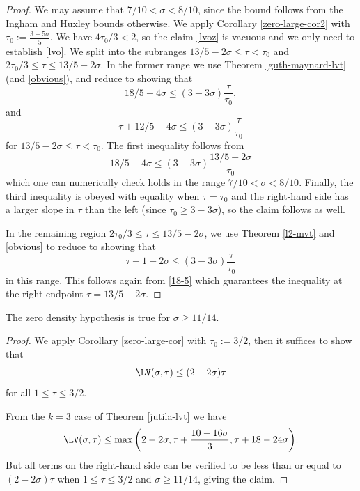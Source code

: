 \begin{proof} We may assume that $7/10 < \sigma < 8/10$, since the bound follows from the Ingham and Huxley bounds otherwise.  We apply Corollary \ref{zero-large-cor2} with $\tau_0 := \frac{3+5\sigma}{5}$.  We have $4\tau_0/3 < 2$, so the claim \eqref{lvoz} is vacuous and we only need to establish \eqref{lvo}.  We split into the subranges $13/5-2\sigma \leq \tau < \tau_0$ and $2\tau_0/3 \leq \tau \leq 13/5-2\sigma$. In the former range we use Theorem \ref{guth-maynard-lvt} (and \eqref{obvious}), and reduce to showing that
$$ 18/5 - 4 \sigma \leq (3-3\sigma) \frac{\tau}{\tau_0},$$
and
$$ \tau + 12/5 - 4\sigma \leq (3-3\sigma) \frac{\tau}{\tau_0}$$
for $13/5-2\sigma \leq \tau < \tau_0$.  The first inequality follows from
\begin{equation}\label{18-5}
 18/5 - 4 \sigma \leq (3-3\sigma) \frac{13/5-2\sigma}{\tau_0}
\end{equation}
which one can numerically check holds in the range $7/10 < \sigma < 8/10$.  Finally, the third inequality is obeyed with equality when $\tau=\tau_0$ and the right-hand side has a larger slope in $\tau$ than the left (since $\tau_0 \geq 3-3\sigma$), so the claim follows as well.

In the remaining region $2\tau_0/3 \leq \tau \leq 13/5-2\sigma$, we use Theorem \ref{l2-mvt} and \eqref{obvious} to reduce to showing that
$$ \tau + 1 - 2\sigma \leq (3-3\sigma) \frac{\tau}{\tau_0}$$
in this range.  This follows again from \eqref{18-5} which guarantees the inequality at the right endpoint $\tau = 13/5-2\sigma$.
\end{proof}

\begin{theorem}\label{jutila-density} \cite{jutila_zero_density_1977} The zero density hypothesis is true for $\sigma \geq 11/14$.
\end{theorem}
\derived
{}

\begin{proof}
We apply Corollary \ref{zero-large-cor} with $\tau_0 := 3/2$, then it suffices to show that
    $$\LV(\sigma,\tau) \leq (2-2\sigma) \tau$$
    for all $1 \leq \tau \leq 3/2$.

    From the $k=3$ case of Theorem \ref{jutila-lvt} we have
    $$\LV(\sigma,\tau) \leq \max \bigg(2-2\sigma, \tau + \frac{10-16\sigma}{3}, \tau + 18-24\sigma \bigg).$$
    But all terms on the right-hand side can be verified to be less than or equal to $(2-2\sigma)\tau$ when $1 \leq \tau \leq 3/2$ and $\sigma \geq 11/14$, giving the claim.
\end{proof}

